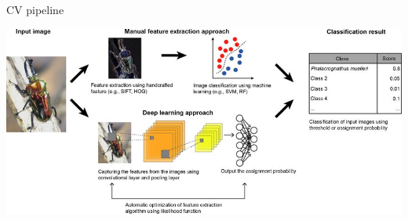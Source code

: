 \documentclass[aspectratio=169,xcolor=dvipsnames]{beamer}
\begin{document}
\begin{frame}{CV pipeline}
    \begin{center}
        \includegraphics[width=\textwidth]{../images/Schematic-diagram-of-computer-vision-machine-learning-pipeline-for-image-based-species.png}
    \end{center}
\end{frame}
\end{document}
